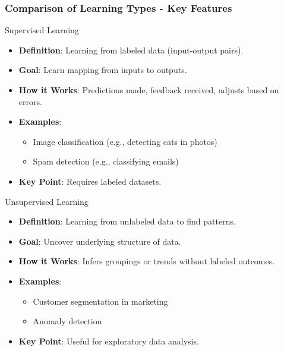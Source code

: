 \documentclass[aspectratio=169]{beamer}
\begin{document}
\begin{frame}[fragile]
    \frametitle{Comparison of Learning Types - Key Features}
    \begin{block}{Supervised Learning}
        \begin{itemize}
            \item \textbf{Definition}: Learning from labeled data (input-output pairs).
            \item \textbf{Goal}: Learn mapping from inputs to outputs.
            \item \textbf{How it Works}: Predictions made, feedback received, adjusts based on errors.
            \item \textbf{Examples}: 
            \begin{itemize}
                \item Image classification (e.g., detecting cats in photos)
                \item Spam detection (e.g., classifying emails)
            \end{itemize}
            \item \textbf{Key Point}: Requires labeled datasets.
        \end{itemize}
    \end{block}
    
    \begin{block}{Unsupervised Learning}
        \begin{itemize}
            \item \textbf{Definition}: Learning from unlabeled data to find patterns.
            \item \textbf{Goal}: Uncover underlying structure of data.
            \item \textbf{How it Works}: Infers groupings or trends without labeled outcomes.
            \item \textbf{Examples}: 
            \begin{itemize}
                \item Customer segmentation in marketing
                \item Anomaly detection
            \end{itemize}
            \item \textbf{Key Point}: Useful for exploratory data analysis.
        \end{itemize}
    \end{block}
\end{frame}
\end{document}
